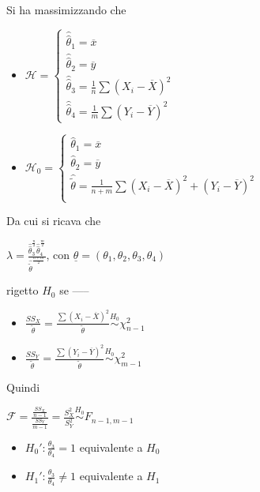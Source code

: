 \documentclass[hidelinks, 10pt]{report}
\begin{document}
Si ha massimizzando che
\begin{itemize}
\item $ \mathcal{H} = \begin{cases}
\hat{\hat{\theta}}_{1} = \overline{x} \\
\hat{\hat{\theta}}_{2} = \overline{y} \\
\hat{\hat{\theta}}_{3} = \frac{1}{n} \sum (X_{i} - \overline{X})^{2} \\
\hat{\hat{\theta}}_{4} = \frac{1}{m} \sum (Y_{i} - \overline{Y})^{2}
\end{cases} $
\item $ \mathcal{H}_{0} = \begin{cases}
\hat{\theta}_{1} = \overline{x} \\
\hat{\theta}_{2} = \overline{y} \\
\hat{\tilde{\theta}} = \frac{1}{n + m} \sum (X_{i} - \overline{X})^{2} + (Y_{i} - \overline{Y})^{2} \\
\end{cases} $
\end{itemize}

Da cui si ricava che

$ \lambda = \frac{\hat{\hat{\theta}}_{3}^{\frac{n}{2}} \hat{\hat{\theta}}_{4}^{\frac{m}{2}}}{\hat{\tilde{\theta}}^{\frac{n + m}{2}}} $, con $ \underline{\theta} = (\theta_{1}, \theta_{2}, \theta_{3}, \theta_{4}) $

rigetto $ H_{0} $ se -----

\begin{itemize}
\item $ \frac{SS_{X}}{\tilde{\theta}} = \frac{\sum (X_{i} - \overline{X})^{2}}{\tilde{\theta}} \stackrel{H_{0}}{\sim} \chi^{2}_{n - 1} $
\item $ \frac{SS_{Y}}{\tilde{\theta}} = \frac{\sum (Y_{i} - \overline{Y})^{2}}{\tilde{\theta}} \stackrel{H_{0}}{\sim} \chi^{2}_{m - 1} $
\end{itemize}

Quindi

$ \mathcal{F} = \frac{\frac{SS_{X}}{n - 1}}{\frac{SS_{Y}}{m - 1}} = \frac{S_{X}^{2}}{S_{Y}^{2}} \stackrel{H_{0}}{\sim} F_{n - 1, m - 1} $

\begin{itemize}
\item $ H_{0}' : \frac{\theta_{3}}{\theta_{4}} = 1 $ equivalente a $ H_{0} $
\item $ H_{1}' : \frac{\theta_{3}}{\theta_{4}} \ne 1 $ equivalente a $ H_{1} $
\end{itemize}
\end{document}
